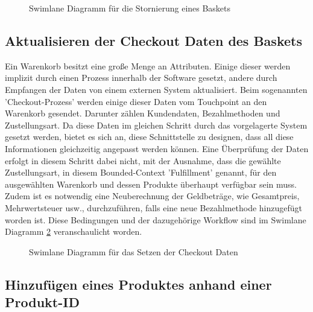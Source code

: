 \begin{figure}[htbp]
	\centering
	
	\caption{Swimlane Diagramm für die Stornierung eines Baskets}
	\label{fig:SL-Basketstornierung}
\end{figure}

\subsection{Aktualisieren der Checkout Daten des Baskets}

Ein Warenkorb besitzt eine große Menge an Attributen. Einige dieser werden implizit durch einen Prozess innerhalb der Software gesetzt, andere durch Empfangen der Daten von einem externen System aktualisiert. Beim sogenannten 'Checkout-Prozess' werden einige dieser Daten vom Touchpoint an den Warenkorb gesendet. Darunter zählen Kundendaten, Bezahlmethoden und Zustellungsart. Da diese Daten im gleichen Schritt durch das vorgelagerte System gesetzt werden, bietet es sich an, diese Schnittstelle zu designen, dass all diese Informationen gleichzeitig angepasst werden können. Eine Überprüfung der Daten erfolgt in diesem Schritt dabei nicht, mit der Ausnahme, dass die gewählte Zustellungsart, in diesem Bounded-Context 'Fulfillment' genannt, für den ausgewählten Warenkorb und dessen Produkte überhaupt verfügbar sein muss. Zudem ist es notwendig eine Neuberechnung der Geldbeträge, wie Gesamtpreis, Mehrwertsteuer usw., durchzuführen, falls eine neue Bezahlmethode hinzugefügt worden ist. Diese Bedingungen und der dazugehörige Workflow sind im Swimlane Diagramm \ref{fig:SL-Checkoutdata} veranschaulicht worden.

\begin{figure}[htbp]
	\centering
	
	\caption{Swimlane Diagramm für das Setzen der Checkout Daten}
	\label{fig:SL-Checkoutdata}
\end{figure}

\subsection{Hinzufügen eines Produktes anhand einer Produkt-ID}

